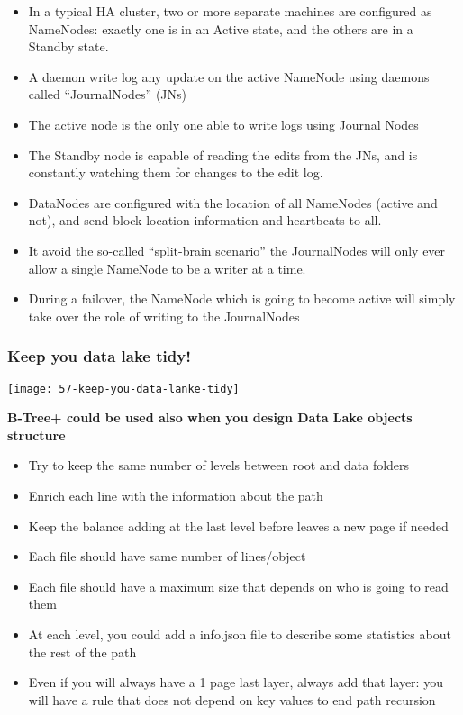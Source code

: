 \begin{itemize}
	\item In a typical HA cluster, two or more separate machines are configured as NameNodes: exactly one is in an Active state, and the others are in a Standby state.
	\item A daemon write log any update on the active NameNode using daemons called “JournalNodes” (JNs)
	\item The active node is the only one able to write logs using Journal Nodes
	\item The Standby node is capable of reading the edits from the JNs, and is constantly watching them for changes to the edit log.
	\item DataNodes are configured with the location of all NameNodes (active and not), and send block location information and heartbeats to all.
	\item It avoid the so-called “split-brain scenario” the JournalNodes will only ever allow a single NameNode to be a writer at a time.
	\item During a failover, the NameNode which is going to become active will simply take over the role of writing to the JournalNodes
\end{itemize}

\subsubsection{Keep you data lake tidy!}


\begin{center}
\texttt{[image: 57-keep-you-data-lanke-tidy]}
\end{center}

\textbf{B-Tree+ could be used also when you design Data Lake objects structure}
\begin{itemize}
	\item Try to keep the same number of levels between root and data folders
	\item Enrich each line with the information about the path
	\item Keep the balance adding at the last level before leaves a new page if needed
	\item Each file should have same number of lines/object
	\item Each file should have a maximum size that depends on who is going to read them
	\item At each level, you could add a info.json file to describe some statistics about the rest of the path
	\item Even if you will always have a 1 page last layer, always add that layer: you will have a rule that does not depend on key values to end path recursion
\end{itemize}


